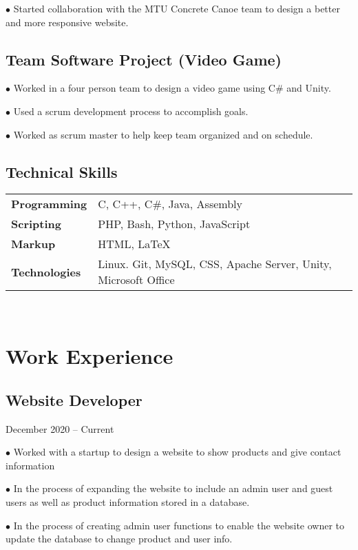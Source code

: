 \documentclass[12pt]{article}
\begin{document}
$\bullet$ Started collaboration with the MTU Concrete Canoe team to design a better and more responsive website.

\subsection{Team Software Project (Video Game)} \hfill

$\bullet$ Worked in a four person team to design a video game using C\# and Unity.

$\bullet$ Used a scrum development process to accomplish goals.

$\bullet$ Worked as scrum master to help keep team organized and on schedule.

\subsection{Technical Skills} \hfill

\begin{tabular}{l l}
    {\bfseries Programming}   & C, C++, C\#, Java, Assembly \\
    {\bfseries Scripting}     & PHP, Bash, Python, JavaScript  \\
    {\bfseries Markup}        &  HTML, {\LaTeX}\\
    {\bfseries Technologies}  &  Linux. Git, MySQL, CSS, Apache Server, Unity, Microsoft Office \\
\end{tabular}\\


\section{Work Experience}

\subsection{Website Developer}\hfill December 2020 -- Current

$\bullet$ Worked with a startup to design a website to show products and give contact information

$\bullet$ In the process of expanding the website to include an admin user and guest users as well as product information stored in a database.

$\bullet$ In the process of creating admin user functions to enable the website owner to update the database to change product and user info.
\end{document}

